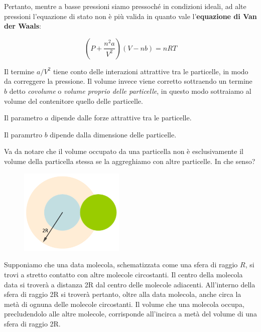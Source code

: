 Pertanto, mentre a basse pressioni siamo pressoché in condizioni ideali, ad alte pressioni l'equazione di stato non è più valida in quanto vale l'\textbf{equazione di Van der Waals}:

$$\left( P + \frac{n^2a}{V^2} \right)(V-nb)=nRT$$

Il termine $a/V^2$ tiene conto delle interazioni attrattive tra le particelle, in modo da correggere la pressione. Il volume invece viene corretto sottraendo un termine $b$ detto \textit{covolume} o \textit{volume proprio delle particelle}, in questo modo sottraiamo al volume del contenitore quello delle particelle.

Il parametro $a$ dipende dalle forze attrattive tra le particelle.

Il paramrtro $b$ dipende dalla dimensione delle particelle.

\vspace{0.2cm}Va da notare che il volume occupato da una particella non è esclusivamente il volume della particella stessa se la aggreghiamo con altre particelle. In che senso?

\hspace{0.5cm}\begin{minipage}{0.35 \textwidth}
    \begin{figure}[H]
        \includegraphics[width=5cm]{immagini/particelle_aggregate.png}
    \end{figure}
\end{minipage}
\begin{minipage}{0.6 \textwidth}
    \vspace{0.8cm}Supponiamo che una data molecola, schematizzata come una sfera di raggio $R$, si trovi a stretto contatto con altre molecole circostanti.
    Il centro della molecola data si troverà a distanza 2R dal centro delle
    molecole adiacenti. All’interno della sfera di raggio 2R si troverà pertanto, oltre alla data molecola, anche circa la metà di ognuna delle molecole circostanti.
    Il volume che una molecola occupa, precludendolo alle altre molecole, corrisponde all’incirca a metà del volume di una sfera di raggio 2R. 
\end{minipage}

